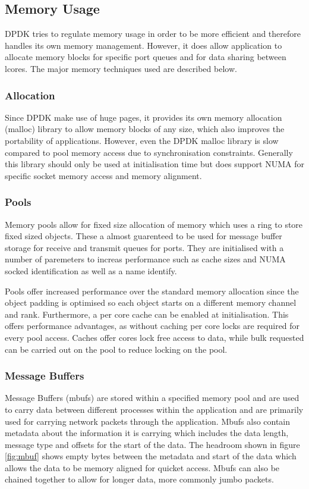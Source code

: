 \documentclass[final_report.tex]{subfiles}
\begin{document}
\subsection{Memory Usage}
DPDK tries to regulate memory usage in order to be more efficient and therefore handles its own memory management. However, it does allow application to allocate memory blocks for specific port queues and for data sharing between lcores. The major memory techniques used are described below.

\subsubsection{Allocation}
Since DPDK make use of huge pages, it provides its own memory allocation (malloc) library to allow memory blocks of any size, which also improves the portability of applications. However, even the DPDK malloc library is slow compared to pool memory access due to synchronisation constraints. Generally this library should only be used at initialisation time but does support NUMA for specific socket memory access and memory alignment.

\subsubsection{Pools}
Memory pools allow for fixed size allocation of memory which uses a ring to store fixed sized objects. These a almost guarenteed to be used for message buffer storage for receive and transmit queues for ports. They are initialised with a number of paremeters to increas performance such as cache sizes and NUMA socked identification as well as a name identify.

Pools offer increased performance over the standard memory allocation since the object padding is optimised so each object starts on a different memory channel and rank. Furthermore, a per core cache can be enabled at initialisation. This offers performance advantages, as without caching per core locks are required for every pool access. Caches offer cores lock free access to data, while bulk requested can be carried out on the pool to reduce locking on the pool.

\subsubsection{Message Buffers}
Message Buffers (mbufs) are stored within a specified memory pool and are used to carry data between different processes within the application and are primarily used for carrying network packets through the application. Mbufs also contain metadata about the information it is carrying which includes the data length, message type and offsets for the start of the data. The headroom shown in figure \ref{fig:mbuf} shows empty bytes between the metadata and start of the data which allows the data to be memory aligned for quicket access. Mbufs can also be chained together to allow for longer data, more commonly jumbo packets.
\end{document}

